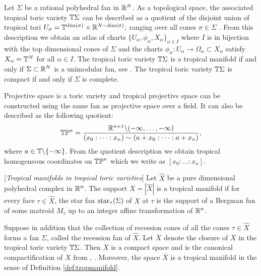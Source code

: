 \begin{exa}\label{ex:toricman}
Let $\Sigma$ be a rational polyhedral fan in $\mathbb{R}^N$.
As a topological space, the associated tropical toric variety $\mathbb{T}\Sigma$ can be described as a quotient of the disjoint union of tropical tori $U_{\sigma} = \mathbb{T}^{\dim(\sigma)} \times \mathbb{R}^{N - \dim(\sigma)},$ ranging over all cones $\sigma \in \Sigma$ \cite[Definition 3.2.3]{MikRau}. 
From this description we obtain an atlas of charts $\{U_{\alpha}, \phi_{\alpha}, X_{\alpha} \}_{\alpha \in I}$ where $I$ is in bijection with the top dimensional cones of $\Sigma$ and the charts $\phi_{\alpha}: U_{\alpha} \to \Omega_{\alpha} \subset X_{\alpha}$ satisfy $X_{\alpha} = \mathbb{T}^N$ for all $\alpha \in I$. 
The tropical toric variety $\mathbb{T}\Sigma$ is a tropical manifold if and only if  $\Sigma \subset \mathbb{R}^N$ is a  unimodular fan, see \cite[Section 3.2]{MikRau}.  The tropical toric variety $\mathbb{T}\Sigma$ is compact if and only if $\Sigma$ is complete.   
\end{exa}


\begin{exa}
Projective space is a toric variety and 
tropical projective space can be constructed using the same fan as projective space over a field. It can also be described as the following quotient:
$$\mathbb{TP}^{n} = \frac{\mathbb{R}^{n+1} \backslash ( -\infty, \dots, -\infty)}{(x_0: \dots :x_n) \sim (a + x_0: \dots :a +x_n)  },$$
where $a \in \mathbb{T} \backslash \{-\infty\}$.
From the quotient description we obtain tropical homogeneous coordinates on $\mathbb{TP}^n$ which we write as $[x_0 : \dots : x_n]$.   
\end{exa}



\begin{exa}\label{ex:submanifolds}
[\emph{Tropical manifolds in  tropical toric varieties}]
Let $\hat{X}$ be a pure dimensional polyhedral complex in $\mathbb{R}^n$. The support $X = |\hat{X}|$ is a tropical manifold if for every face $\tau \in \hat X$, the star fan ${\rm star}_\tau(\Sigma)$ of $X$ at  $\tau$ is the support of a Bergman fan of some matroid $M_{\tau}$ up to an integer affine transformation of $\mathbb{R}^n$. 

Suppose in addition that the collection of recession cones of all the cones $\tau \in \hat X$ forms a fan $\Sigma$, called the recession fan of $\hat X$.
Let $\overline{X}$ denote the closure of $X$ in the tropical toric variety $\mathbb{T} \Sigma$.
Then $\overline{X}$ is a compact space and is the canonical compactification of $X$ from \cite{KastnerShawWinz}, \cite{AminiPiquerez}.  Moreover, the space $\overline{X}$ is a tropical manifold in the sense of Definition \ref{def:tropmanifold}. 
\end{exa}



